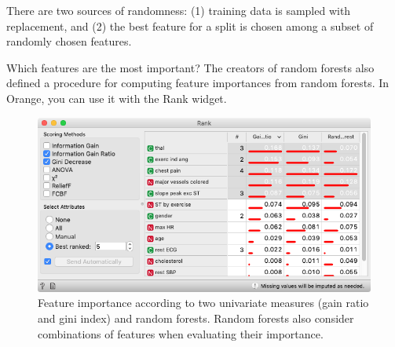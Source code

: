 There are two sources of randomness: (1) training data is sampled with replacement, and (2) the best feature for a split is chosen among a subset of randomly chosen features.

Which features are the most important? The creators of random forests also defined a procedure for computing feature importances from random forests. In Orange, you can use it with the Rank widget.

\begin{figure}[h]
    \centering
    \includegraphics[scale=0.35]{graphics/ch-random_forests/rank.png}
    \caption{Feature importance according to two univariate measures (gain ratio and gini index) and random forests. Random forests also consider combinations of features when evaluating their importance. }
\end{figure}
